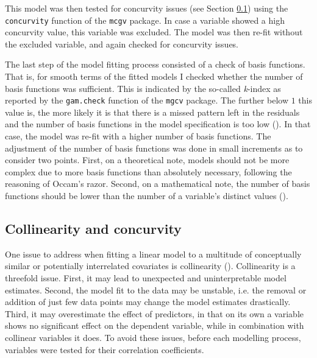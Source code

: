 This model was then tested for concurvity issues (see Section \ref{section03_2_3}) using the \texttt{concurvity} function of the \texttt{mcgv} package. In case a variable showed a high concurvity value, this variable was excluded. The model was then re-fit without the excluded variable, and again checked for concurvity issues.

The last step of the model fitting process consisted of a check of basis functions. That is, for smooth terms of the fitted models I checked whether the number of basis functions was sufficient. This is indicated by the so-called \textit{k}-index as reported by the \texttt{gam.check} function of the \texttt{mgcv} package. The further below $1$ this value is, the more likely it is that there is a missed pattern left in the residuals  and the number of basis functions in the model specification is too low (\cite{Wood2017}). In that case, the model was re-fit with a higher number of basis functions. The adjustment of the number of basis functions was done in small increments as to consider two points. First, on a theoretical note, models should not be more complex due to more basis functions than absolutely necessary, following the reasoning of Occam’s razor. Second, on a mathematical note, the number of basis functions should be lower than the number of a variable’s distinct values (\cite{Baayen2020}).

\subsection{Collinearity and concurvity}\label{section03_2_3}

One issue to address when fitting a linear model to a multitude of conceptually similar or potentially interrelated covariates is collinearity (\cite{Tomaschek2018collin}). Collinearity is a threefold issue. First, it may lead to unexpected and uninterpretable model estimates. Second, the model fit to the data may be unstable, i.e. the removal or addition of just few data points may change the model estimates drastically. Third, it may overestimate the effect of predictors, in that on its own a variable shows no significant effect on the dependent variable, while in combination with collinear variables it does. To avoid these issues, before each modelling process, variables were tested for their correlation coefficients.

